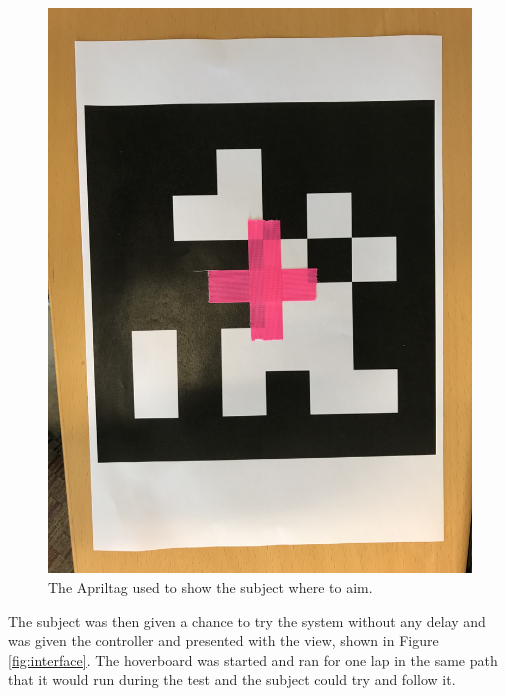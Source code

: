 \documentclass[nofilelist]{cslthse-msc}
\begin{document}
\begin{figure}[!hbt]
   \centering
   \includegraphics[scale=0.08]{images/apriltag.jpg} 
   \caption{The Apriltag used to show the subject where to aim.}
   \label{fig:apriltag}
\end{figure}

The subject was then given a chance to try the system without any delay and was given the controller and presented with the view, shown in Figure \ref{fig:interface}. The hoverboard was started and ran for one lap in the same path that it would run during the test and the subject could try and follow it.
\end{document}
